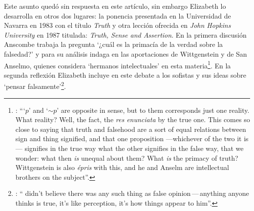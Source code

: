 Este asunto quedó sin respuesta en este artículo, sin embargo Elizabeth lo desarrolla en otros dos lugares: la ponencia presentada en la Universidad de Navarra en 1983 con el título \emph{Truth} y otra lección ofrecida en \emph{John Hopkins University} en 1987 titulada: \emph{Truth, Sense and Assertion}. En la primera discusión Anscombe trabaja la pregunta \enquote*{¿cuál es la primacía de la verdad sobre la falsedad?} y para su análisis indaga en las aportaciones de Wittgenstein y de San Anselmo, quienes considera `hermanos intelectuales' en esta materia\footnote{\cite[Cf.][73]{anscombe2011plato:truth}: \enquote{`$p$' and `${\sim}p$' are opposite in sense, but to them corresponds just one reality. What reality? Well, the fact, the \emph{res enunciata} by the true one. This comes so close to saying that truth and falsehood are a sort of equal relations between sign and thing signified, and that one proposition ---whichever of the two it is--- signifies in the true way what the other signifies in the false way, that we wonder: what then \emph{is} unequal about them? What \emph{is} the primacy of truth? Wittgenstein is also \emph{épris} with this, and he and Anselm are intellectual brothers on the subject}.}. En la segunda reflexión Elizabeth incluye en este debate a los sofistas y sus ideas sobre `pensar falsamente'\footnote{\cite[264]{anscombe2015logic:tsa}: \enquote{ didn't believe there was any such thing as false opinion\,---\,anything anyone thinks is true, it's like perception, it's how things appear to him}.}.

